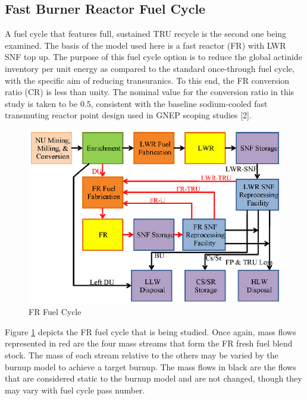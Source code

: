 \subsection{Fast Burner Reactor Fuel Cycle}
\label{1g_sec:FRFC}
A fuel cycle that features full, sustained TRU recycle is the second one being examined.  The basis 
of the model used here is a fast reactor (FR) with LWR SNF top up.  The purpose of this fuel cycle 
option is to reduce the global actinide inventory per unit energy as compared to the standard 
once-through fuel cycle, with the specific aim of reducing transuranics.   To this end, the FR 
conversion ratio (CR) is less than unity.  The nominal value for the conversion ratio in this 
study is taken to be 0.5, consistent with the baseline sodium-cooled fast transmuting reactor 
point design used in GNEP scoping studies [2].  
\begin{figure}[htbp]
\caption{FR Fuel Cycle}
\label{1g_fig09}
\begin{center}
\includegraphics[scale=1.0]{one_group_method/figs/Fig09.eps}
\end{center}
\end{figure}
Figure \ref{1g_fig09} depicts the FR fuel cycle that is being studied.  Once again, mass flows 
represented in red are the four mass streams that form the FR fresh fuel blend stock.  The mass 
of each stream relative to the others may be varied by the burnup model to achieve a target burnup.  
The mass flows in black are the flows that are considered static to the burnup model and are not changed, 
though they may vary with fuel cycle pass number.  

